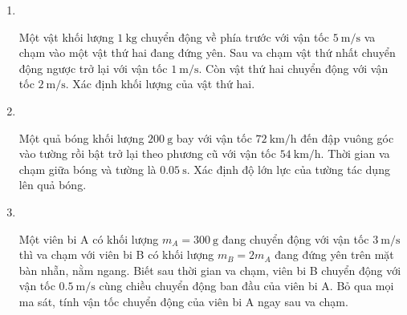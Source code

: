 \begin{enumerate}[label=\bfseries Bài \arabic*:]
{}

\item{}\\
{Một vật khối lượng $\SI{1}{\kilogram}$ chuyển động về phía trước với vận tốc $\SI{5}{\meter/\second}$ va chạm vào một vật thứ hai đang đứng yên. Sau va chạm vật thứ nhất chuyển động ngược trở lại với vận tốc $\SI{1}{\meter/\second}$. Còn vật thứ hai chuyển động với vận tốc $\SI{2}{\meter/\second}$. Xác định khối lượng của vật thứ hai.

}

\item {}\\
{Một quả bóng khối lượng $\SI{200}{\gram}$ bay với vận tốc $\SI{72}{\kilo\meter/\hour}$ đến đập vuông góc vào tường rồi bật trở lại theo phương cũ với vận tốc $\SI{54}{\kilo\meter/\hour}$. Thời gian va chạm giữa bóng và tường là $\SI{0.05}{\second}$. Xác định độ lớn lực của tường tác dụng lên quả bóng.

}

\item {}\\
{Một viên bi A có khối lượng $m_A=\SI{300}{\gram}$ đang chuyển động với vận tốc $\SI{3}{\meter/\second}$ thì va chạm với viên bi B có khối lượng $m_B=2m_A$ đang đứng yên trên mặt bàn nhẵn, nằm ngang. Biết sau thời gian va chạm, viên bi B chuyển động với vận tốc $\SI{0.5}{\meter/\second}$ cùng chiều chuyển động ban đầu của viên bi A. Bỏ qua mọi ma sát, tính vận tốc chuyển động của viên bi A ngay sau va chạm.

}
\end{enumerate}
